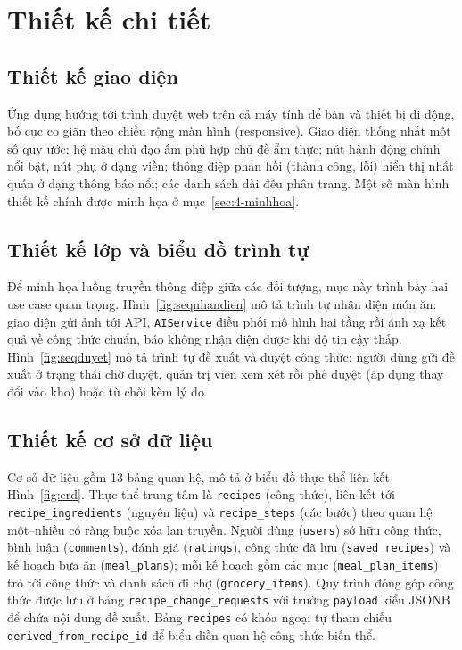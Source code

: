 \documentclass[../DoAn.tex]{subfiles}
\begin{document}

\section{Thiết kế chi tiết}
\label{sec:4-chitiet}

\subsection{Thiết kế giao diện}
Ứng dụng hướng tới trình duyệt web trên cả máy tính để bàn và thiết bị di động, bố cục co giãn theo chiều rộng màn hình (responsive). Giao diện thống nhất một số quy ước: hệ màu chủ đạo ấm phù hợp chủ đề ẩm thực; nút hành động chính nổi bật, nút phụ ở dạng viền; thông điệp phản hồi (thành công, lỗi) hiển thị nhất quán ở dạng thông báo nổi; các danh sách dài đều phân trang. Một số màn hình thiết kế chính được minh họa ở mục~\ref{sec:4-minhhoa}.

\subsection{Thiết kế lớp và biểu đồ trình tự}
Để minh họa luồng truyền thông điệp giữa các đối tượng, mục này trình bày hai use case quan trọng. Hình~\ref{fig:seqnhandien} mô tả trình tự nhận diện món ăn: giao diện gửi ảnh tới API, \texttt{AIService} điều phối mô hình hai tầng rồi ánh xạ kết quả về công thức chuẩn, báo không nhận diện được khi độ tin cậy thấp. Hình~\ref{fig:seqduyet} mô tả trình tự đề xuất và duyệt công thức: người dùng gửi đề xuất ở trạng thái chờ duyệt, quản trị viên xem xét rồi phê duyệt (áp dụng thay đổi vào kho) hoặc từ chối kèm lý do.



\subsection{Thiết kế cơ sở dữ liệu}
Cơ sở dữ liệu gồm 13 bảng quan hệ, mô tả ở biểu đồ thực thể liên kết Hình~\ref{fig:erd}. Thực thể trung tâm là \texttt{recipes} (công thức), liên kết tới \texttt{recipe\_ingredients} (nguyên liệu) và \texttt{recipe\_steps} (các bước) theo quan hệ một--nhiều có ràng buộc xóa lan truyền. Người dùng (\texttt{users}) sở hữu công thức, bình luận (\texttt{comments}), đánh giá (\texttt{ratings}), công thức đã lưu (\texttt{saved\_recipes}) và kế hoạch bữa ăn (\texttt{meal\_plans}); mỗi kế hoạch gồm các mục (\texttt{meal\_plan\_items}) trỏ tới công thức và danh sách đi chợ (\texttt{grocery\_items}). Quy trình đóng góp công thức được lưu ở bảng \texttt{recipe\_change\_requests} với trường \texttt{payload} kiểu JSONB để chứa nội dung đề xuất. Bảng \texttt{recipes} có khóa ngoại tự tham chiếu \texttt{derived\_from\_recipe\_id} để biểu diễn quan hệ công thức biến thể.
\end{document}
